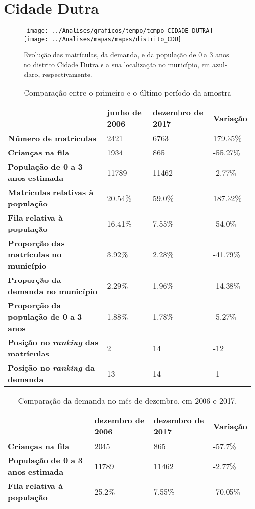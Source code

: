 \section{Cidade Dutra}
\begin{figure}[H]
\centering
\texttt{[image: ../Analises/graficos/tempo/tempo\_CIDADE\_DUTRA]}
\texttt{[image: ../Analises/mapas/mapas/distrito\_CDU]}
\caption{Evolução das matrículas, da demanda, e da população de 0 a 3 anos no distrito Cidade Dutra e a sua localização no município, em azul-claro, respectivamente.}
\end{figure}
\begin{table}[H]
\begin{tabular}{l|l|l|l}
\textbf{}                                      & \textbf{junho de 2006}       & \textbf{dezembro de 2017}    & \textbf{Variação} \\ \hline
\textbf{Número de matrículas}                  & 2421 & 6763 & 179.35\% \\ \hline
\textbf{Crianças na fila}                      & 1934 & 865 & -55.27\% \\ \hline
\textbf{População de 0 a 3 anos estimada}      & 11789 & 11462 & -2.77\% \\ \hline
\textbf{Matrículas relativas à população}      & 20.54\% & 59.0\% & 187.32\% \\ \hline
\textbf{Fila relativa à população}             & 16.41\% & 7.55\% & -54.0\% \\ \hline
\textbf{Proporção das matrículas no município} & 3.92\% & 2.28\% & -41.79\% \\ \hline
\textbf{Proporção da demanda no município}     & 2.29\% & 1.96\% & -14.38\% \\ \hline
\textbf{Proporção da população de 0 a 3 anos}  & 1.88\% & 1.78\% & -5.27\% \\ \hline
\textbf{Posição no \textit{ranking} das matrículas}     & 2 & 14 & -12 \\ \hline
\textbf{Posição no \textit{ranking} da demanda}         & 13 & 14 & -1 \\ 
\end{tabular}
\caption{Comparação entre o primeiro e o último período da amostra}
\end{table}
\begin{table}[H]
\begin{tabular}{l|l|l|l}
\textbf{}                                 & \textbf{dezembro de 2006} & \textbf{dezembro de 2017} & \textbf{Variação} \\ \hline
\textbf{Crianças na fila}                      & 2045 & 865 & -57.7\% \\ \hline
\textbf{População de 0 a 3 anos estimada}      & 11789 & 11462 & -2.77\% \\ \hline
\textbf{Fila relativa à população}             & 25.2\% & 7.55\% & -70.05\% \\
\end{tabular}
\caption{Comparação da demanda no mês de dezembro, em 2006 e 2017.}
\end{table}
